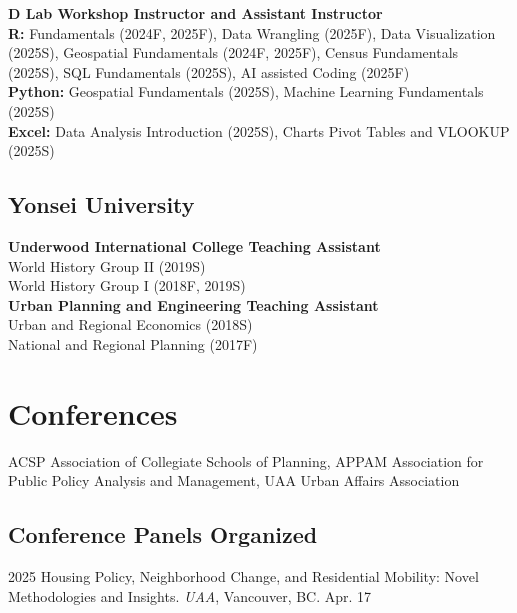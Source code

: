 \documentclass[11pt,letterpaper]{article}
\newcommand{\term}[1]{(#1)}     %
\begin{document}
\textbf{D Lab  Workshop Instructor and Assistant Instructor}\\[0.2em]
\textbf{R:} Fundamentals \term{2024F, 2025F}, Data Wrangling \term{2025F}, Data Visualization \term{2025S}, Geospatial Fundamentals \term{2024F, 2025F}, Census Fundamentals \term{2025S}, SQL Fundamentals \term{2025S}, AI assisted Coding \term{2025F}\\[0.2em]
\textbf{Python:} Geospatial Fundamentals \term{2025S}, Machine Learning Fundamentals \term{2025S}\\[0.2em]
\textbf{Excel:} Data Analysis Introduction \term{2025S}, Charts Pivot Tables and VLOOKUP \term{2025S}

\subsection{Yonsei University}
\textbf{Underwood International College  Teaching Assistant}\\[0.2em]
World History Group II \term{2019S}\\
World History Group I \term{2018F, 2019S}\\[0.5em]
\textbf{Urban Planning and Engineering  Teaching Assistant}\\[0.2em]
Urban and Regional Economics \term{2018S}\\
National and Regional Planning \term{2017F}

\section{Conferences}
ACSP Association of Collegiate Schools of Planning, APPAM Association for Public Policy Analysis and Management, UAA Urban Affairs Association

\subsection{Conference Panels Organized}
\begin{tablist}
  \item[2025] \tab{}Housing Policy, Neighborhood Change, and Residential Mobility: Novel Methodologies and Insights. \emph{UAA}, Vancouver, BC. Apr. 17
\end{tablist}
\end{document}
